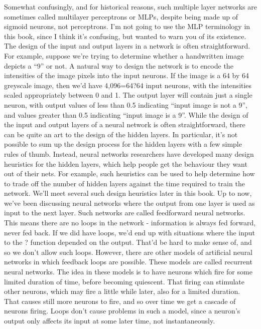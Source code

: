 Somewhat confusingly, and for historical reasons, such multiple layer networks are sometimes called multilayer perceptrons or MLPs, despite being made up of sigmoid neurons, not perceptrons. I'm not going to use the MLP terminology in this book, since I think it's confusing, but wanted to warn you of its existence.
The design of the input and output layers in a network is often straightforward. For example, suppose we're trying to determine whether a handwritten image depicts a ``9'' or not. A natural way to design the network is to encode the intensities of the image pixels into the input neurons. If the image is a 64 by 64 greyscale image, then we'd have 4,096=64?64 input neurons, with the intensities scaled appropriately between 0 and 1. The output layer will contain just a single neuron, with output values of less than 0.5 indicating ``input image is not a 9'', and values greater than 0.5 indicating ``input image is a 9''.
While the design of the input and output layers of a neural network is often straightforward, there can be quite an art to the design of the hidden layers. In particular, it's not possible to sum up the design process for the hidden layers with a few simple rules of thumb. Instead, neural networks researchers have developed many design heuristics for the hidden layers, which help people get the behaviour they want out of their nets. For example, such heuristics can be used to help determine how to trade off the number of hidden layers against the time required to train the network. We'll meet several such design heuristics later in this book. 
Up to now, we've been discussing neural networks where the output from one layer is used as input to the next layer. Such networks are called feedforward neural networks. This means there are no loops in the network - information is always fed forward, never fed back. If we did have loops, we'd end up with situations where the input to the ? function depended on the output. That'd be hard to make sense of, and so we don't allow such loops.
However, there are other models of artificial neural networks in which feedback loops are possible. These models are called recurrent neural networks. The idea in these models is to have neurons which fire for some limited duration of time, before becoming quiescent. That firing can stimulate other neurons, which may fire a little while later, also for a limited duration. That causes still more neurons to fire, and so over time we get a cascade of neurons firing. Loops don't cause problems in such a model, since a neuron's output only affects its input at some later time, not instantaneously.
